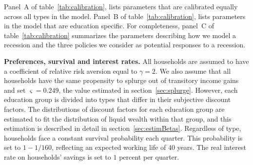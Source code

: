 \documentclass[\econtexRoot/HAFiscal]{subfiles}
\begin{document}
Panel~A of table~\ref{tab:calibration}, lists parameters that are calibrated equally across all types in the model. Panel~B of table~\ref{tab:calibration}, lists parameters in the model that are education specific. For completeness, panel~C of table~\ref{tab:calibration} summarizes the parameters describing how we model a recession and the three policies we consider as potential responses to a recession. 

\textbf{Preferences, survival and interest rates.} All households are assumed to have a coefficient of relative risk aversion equal to $\gamma=2$. We also assume that all households have the same propensity to splurge out of transitory income gains and set $\varsigma=0.249$, the value estimated in section~\ref{sec:splurge}. However, each education group is divided into types that differ in their subjective discount factors. The distributions of discount factors for each education group are estimated to fit the distribution of liquid wealth within that group, and this estimation is described in detail in section~\ref{sec:estimBetas}. Regardless of type, households face a constant survival probability each quarter. This probability is set to $1-1/160$, reflecting an expected working life of 40 years. The real interest rate on households' savings is set to $1$ percent per quarter. 
\end{document}
